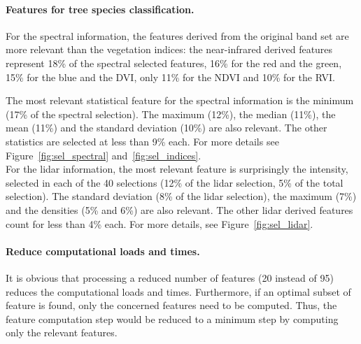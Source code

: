 \paragraph{Features for tree species classification. \\}
For the spectral information, the features derived from the original band set are more relevant than the vegetation indices: the near-infrared derived features represent 18\% of the spectral selected features, 16\% for the red and the green, 15\% for the blue and the DVI, only 11\% for the NDVI and 10\% for the RVI. 

The most relevant statistical feature for the spectral information is the minimum (17\% of the spectral selection). The maximum (12\%), the median (11\%), the mean (11\%) and the standard deviation (10\%) are also relevant. The other statistics are selected at less than 9\% each. For more details see Figure~\ref{fig:sel_spectral} and~\ref{fig:sel_indices}. \\

For the lidar information, the most relevant feature is surprisingly the intensity, selected in each of the 40 selections (12\% of the lidar selection, 5\% of the total selection). The standard deviation (8\% of the lidar selection), the maximum (7\%) and the densities (5\% and 6\%) are also relevant. The other lidar derived features count for less than 4\% each. For more details, see Figure~\ref{fig:sel_lidar}.

\paragraph{Reduce computational loads and times. \\}
It is obvious that processing a reduced number of features (20 instead of 95) reduces the computational loads and times. Furthermore, if an optimal subset of feature is found, only the concerned features need to be computed. Thus, the feature computation step would be reduced to a minimum step by computing only the relevant features.


\datalidar

